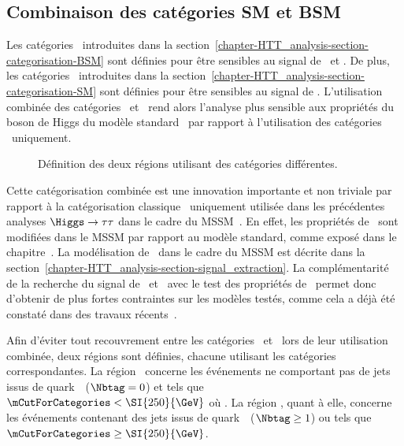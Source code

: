 \subsection{Combinaison des catégories SM et BSM}\label{chapter-HTT_analysis-section-categorisation-SM_and_BSM}
Les catégories \CATbsm\ introduites dans la section~\ref{chapter-HTT_analysis-section-categorisation-BSM} sont définies pour être sensibles au signal de \Higgs\ et \HiggsA.
De plus, les catégories \CATsm\ introduites dans la section~\ref{chapter-HTT_analysis-section-categorisation-SM} sont définies pour être sensibles au signal de \higgs.
L'utilisation combinée des catégories \CATsm\ et \CATbsm\ rend alors l'analyse plus sensible aux propriétés du boson de Higgs du modèle standard \higgs\ par rapport à l'utilisation des catégories \CATbsm\ uniquement.
\begin{wrapfigure}{R}{7cm}
\centering

\caption{Définition des deux régions utilisant des catégories différentes.}
\label{fig-chapter-HTT_analysis-section-categorisation-SM_BSM_diagram}
\end{wrapfigure}
\par
Cette catégorisation combinée est une innovation importante et non triviale par rapport à la catégorisation classique \og \CATbsm\ uniquement \fg{} utilisée dans les précédentes analyses $\Higgs\to\tau\tau$ dans le cadre du MSSM~\cite{CMS-PAS-HIG-13-021,CMS-PAS-HIG-14-029,CMS-PAS-HIG-17-020}.
En effet, les propriétés de \higgs\ sont modifiées dans le MSSM par rapport au modèle standard, comme exposé dans le chapitre~.
La modélisation de \higgs\ dans le cadre du MSSM est décrite dans la section~\ref{chapter-HTT_analysis-section-signal_extraction}.
La complémentarité de la recherche du signal de \Higgs\ et \HiggsA\ avec le test des propriétés de \higgs\ permet donc d'obtenir de plus fortes contraintes sur les modèles testés, comme cela a déjà été constaté dans des travaux récents~\cite{Artur_thesis}.
\par
Afin d'éviter tout recouvrement entre les catégories \CATsm\ et \CATbsm\ lors de leur utilisation combinée, deux régions sont définies, chacune utilisant les catégories correspondantes.
La région \CATsm\ concerne les événements ne comportant pas de jets issus de quark~\quarkb\ ($\Nbtag=0$) et tels que $\mCutForCategories < \SI{250}{\GeV}$ où
\mCutForCategoriesdef.
La région \CATbsm, quant à elle, concerne les événements contenant des jets issus de quark~\quarkb\ ($\Nbtag\geq1$) ou tels que $\mCutForCategories \geq \SI{250}{\GeV}$.
